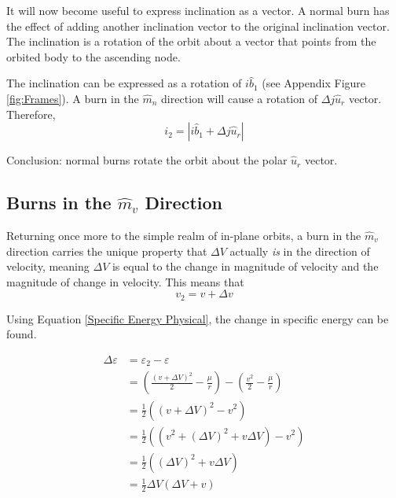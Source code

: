\documentclass[../basicOrbitalDynamics.tex]{subfiles}
\begin{document}
It will now become useful to express inclination as a vector. A normal burn has the effect of adding another inclination vector to the original inclination vector. The inclination is a rotation of the orbit about a vector that points from the orbited body to the ascending node.

The inclination can be expressed as a rotation of $i\hat{b}_1$ (see Appendix Figure  \ref{fig:Frames}). A burn in the $\hat{m}_n$ direction will cause a rotation of $\Delta j\hat{u}_r$ vector. Therefore,
\[i_2=|i\hat{b}_1+\Delta j\hat{u}_r|\]

Conclusion: normal burns rotate the orbit about the polar $\hat{u}_r$ vector.

\bigskip\bigskip
\subsection{Burns in the \texorpdfstring{$\hat{m}_v$}{Velocity} Direction}

Returning once more to the simple realm of in-plane orbits, a burn in the $\hat{m}_v$ direction carries the unique property that $\Delta V$ actually \textit{is} in the direction of velocity, meaning $\Delta V$ is equal to the change in magnitude of velocity and the magnitude of change in velocity. This means that
\[v_2=v+\Delta v\]

Using Equation  \eqref{Specific Energy Physical}, the change in specific energy can be found.

\begin{align*}
    \Delta \varepsilon & = \varepsilon_2 - \varepsilon                                                                        \\
                       & = \left(\frac{(v+\Delta V)^2}{2}-\frac{\mu{}}{r}\right) - \left(\frac{v^2}{2}-\frac{\mu{}}{r}\right) \\
                       & = \frac{1}{2}\left(\left(v+\Delta V\right)^2-v^2\right)                                              \\
                       & = \frac{1}{2}\left(\left(v^2+(\Delta V)^2+v\Delta V\right)-v^2\right)                                \\
                       & = \frac{1}{2}\left((\Delta V)^2+v\Delta V\right)                                                     \\
                       & = \frac{1}{2}\Delta V\left(\Delta V+v\right)                                                         \\
\end{align*}
\end{document}
